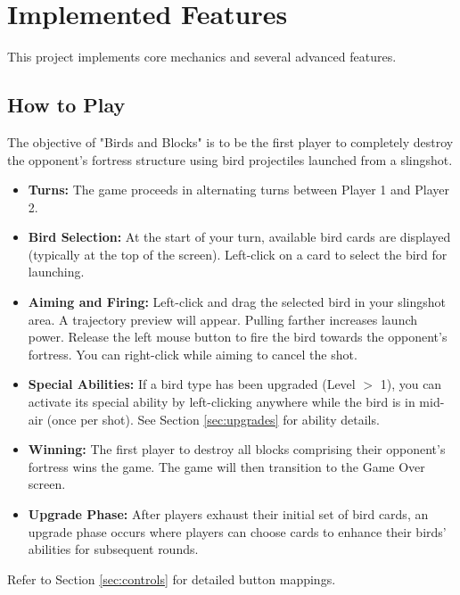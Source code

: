 \documentclass[11pt, a4paper]{article}
\begin{document}
\section{Implemented Features}

This project implements core mechanics and several advanced features.

\subsection{How to Play}
\label{sec:how_to_play}

The objective of "Birds and Blocks" is to be the first player to completely destroy the opponent's fortress structure using bird projectiles launched from a slingshot.

\begin{itemize}

    \item \textbf{Turns:} The game proceeds in alternating turns between Player 1 and Player 2.
    
    \item \textbf{Bird Selection:} At the start of your turn, available bird cards are displayed (typically at the top of the screen). Left-click on a card to select the bird for launching.
    
    \item \textbf{Aiming and Firing:} Left-click and drag the selected bird in your slingshot area. A trajectory preview will appear. Pulling farther increases launch power. Release the left mouse button to fire the bird towards the opponent's fortress. You can right-click while aiming to cancel the shot.
    
    \item \textbf{Special Abilities:} If a bird type has been upgraded (Level $>$ 1), you can activate its special ability by left-clicking anywhere while the bird is in mid-air (once per shot). See Section \ref{sec:upgrades} for ability details.
    
    \item \textbf{Winning:} The first player to destroy all blocks comprising their opponent's fortress wins the game. The game will then transition to the Game Over screen.
    
    \item \textbf{Upgrade Phase:} After players exhaust their initial set of bird cards, an upgrade phase occurs where players can choose cards to enhance their birds' abilities for subsequent rounds.

\end{itemize}
Refer to Section \ref{sec:controls} for detailed button mappings.
\end{document}
